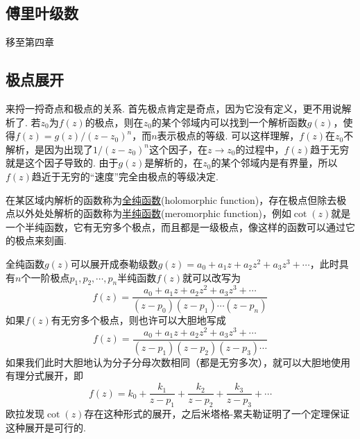 \documentclass[main.tex]{subfiles}
\begin{document}

\subsection{傅里叶级数}

移至第四章

\subsection{极点展开}

来捋一捋奇点和极点的关系. 首先极点肯定是奇点，因为它没有定义，更不用说解析了. 若\(z_0\)为\(f(z)\)的极点，则在\(z_0\)的某个邻域内可以找到一个解析函数\(g(z)\)，使得\(f(z)=g(z)/(z-z_0)^n\)，而\(n\)表示极点的等级. 可以这样理解，\(f(z)\)在\(z_0\)不解析，是因为出现了\(1/(z-z_0)^n\)这个因子，在\(z \to z_0\)的过程中，\(f(z)\)趋于无穷就是这个因子导致的. 由于\(g(z)\)是解析的，在\(z_0\)的某个邻域内是有界量，所以\(f(z)\)趋近于无穷的“速度”完全由极点的等级决定.

在某区域内解析的函数称为\uline{全纯函数}(holomorphic function)，存在极点但除去极点以外处处解析的函数称为\uline{半纯函数}(meromorphic function)，例如\(\cot(z)\)就是一个半纯函数，它有无穷多个极点，而且都是一级极点，像这样的函数可以通过它的极点来刻画. 

全纯函数\(g(z)\)可以展开成泰勒级数\(g(z)=a_0+a_1z+a_2z^2+a_3z^3+\cdots\)，此时具有\(n\)个一阶极点\(p_1, p_2, \cdots, p_n\)半纯函数\(f(z)\)就可以改写为
\[f(z)=\frac{a_0+a_1z+a_2z^2+a_3z^3+\cdots}{(z-p_0)(z-p_1)\cdots(z-p_n)}\]
如果\(f(z)\)有无穷多个极点，则也许可以大胆地写成
\[f(z)=\frac{a_0+a_1z+a_2z^2+a_3z^3+\cdots}{(z-p_1)(z-p_2)(z-p_3)\cdots}\]
如果我们此时大胆地认为分子分母次数相同（都是无穷多次），就可以大胆地使用有理分式展开，即
\[f(z)=k_0+\frac{k_1}{z-p_1}+\frac{k_2}{z-p_2}+\frac{k_3}{z-p_3}+\cdots\]
欧拉发现\(\cot(z)\)存在这种形式的展开，之后米塔格-累夫勒证明了一个定理保证这种展开是可行的.
\end{document}
